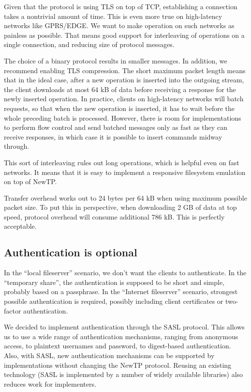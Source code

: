 Given that the protocol is using TLS on top of TCP, establishing a connection takes a nontrivial amount of
time. This is even more true on high-latency networks like GPRS/EDGE. We want to make operation on such
networks as painless as possible. That means good support for interleaving of operations on a single
connection, and reducing size of protocol messages.

The choice of a binary protocol results in smaller messages. In addition, we recommend enabling TLS
compression. The short maximum packet length means that in the ideal case, after a new operation is inserted
into the outgoing stream, the client downloads at most 64 kB of data before receiving a response for the newly
inserted operation. In practice, clients on high-latency networks will batch requests, so that when the new
operation is inserted, it has to wait before the whole preceding batch is processed. However, there is room
for implementations to perform flow control and send batched messages only as fast as they can receive
responses, in which case it is possible to insert commands midway through.

This sort of interleaving rules out long operations, which is helpful even on fast networks. It means that it
is easy to implement a responsive filesystem emulation on top of NewTP.

Transfer overhead works out to 24 bytes per 64 kB when using maximum possible packet size. To put this in
perspective, when downloading 2 GB of data at top speed, protocol overhead will consume additional 786 kB.
This is perfectly acceptable.

%

\subsection{Authentication is optional}

In the ``local fileserver'' scenario, we don't want the clients to authenticate. In the ``temporary share'',
the authentication is supposed to be short and simple, probably based on a passphrase. In the ``Internet
fileserver'' scenario, strongest possible authentication is required, possibly including client certificates
or two-factor authentication.

We decided to implement authentication through the SASL protocol. This allows us to use a wide range of
authentication mechanisms, ranging from anonymous access, to plaintext usernames and password, to digest-based
authentication. Also, with SASL, new authentication mechanisms can be supported by implementations without
changing the NewTP protocol. Reusing an existing technology (SASL is implemented by a number of widely
available libraries) also reduces work for implementers.

